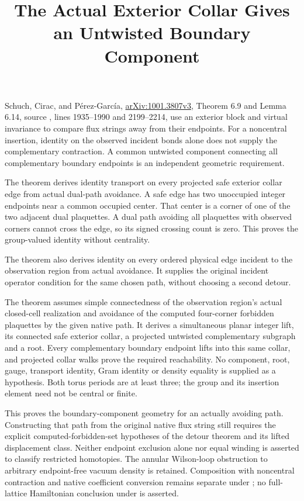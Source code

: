 \documentclass{article}
\title{The Actual Exterior Collar Gives an Untwisted Boundary Component}
\author{}
\date{}
\begin{document}
\maketitle
{}

Schuch, Cirac, and P\'erez-Garc\'ia,
\href{https://arxiv.org/abs/1001.3807v3}{arXiv:1001.3807v3},
Theorem 6.9 and Lemma 6.14, source
, lines 1935--1990 and 2199--2214,
use an exterior block and virtual invariance to compare flux strings away
from their endpoints. For a noncentral insertion, identity on the observed
incident bonds alone does not supply the complementary contraction. A
common untwisted component connecting all complementary boundary endpoints
is an independent geometric requirement.

The theorem
derives identity transport on every projected safe exterior collar edge
from actual dual-path avoidance. A safe edge has two unoccupied integer
endpoints near a common occupied center. That center is a corner of one
of the two adjacent dual plaquettes. A dual path avoiding all plaquettes
with observed corners cannot cross the edge, so its signed crossing count
is zero. This proves the group-valued identity without centrality.

The theorem
also derives identity on every ordered physical edge incident to the
observation region from actual avoidance. It supplies the original incident
operator condition for the same chosen path, without choosing a second detour.

The theorem
assumes simple connectedness of the observation region's actual closed-cell
realization and avoidance of the computed four-corner forbidden plaquettes
by the given native path. It derives a simultaneous planar integer lift,
its connected safe exterior collar, a projected untwisted complementary
subgraph and a root. Every complementary boundary endpoint lifts into
this same collar, and projected collar walks prove the required reachability.
No component, root, gauge, transport identity, Gram identity or density
equality is supplied as a hypothesis. Both torus periods are at least three;
the group and its insertion element need not be central or finite.

This proves the boundary-component geometry for an actually avoiding path.
Constructing that path from the original native flux string still requires
the explicit computed-forbidden-set hypotheses of the detour theorem and
its lifted displacement class. Neither endpoint exclusion alone nor equal
winding is asserted to classify restricted homotopies. The annular
Wilson-loop obstruction to arbitrary endpoint-free vacuum density is
retained. Composition with noncentral contraction and native coefficient
conversion remains separate under ; no full-lattice
Hamiltonian conclusion under  is asserted.
\end{document}
